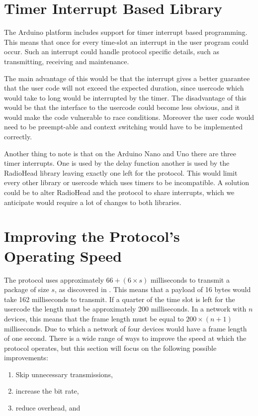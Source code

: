 \section{Timer Interrupt Based Library}
The Arduino platform includes support for timer interrupt based programming.
This means that once for every time-slot an interrupt in the user program could occur.
Such an interrupt could handle protocol specific details, such as transmitting, receiving and maintenance.

The main advantage of this would be that the interrupt gives a better guarantee that the user code will not exceed the expected duration, since usercode which would take to long would be interrupted by the timer.
The disadvantage of this would be that the interface to the usercode could become less obvious, and it would make the code vulnerable to race conditions.
Moreover the user code would need to be preempt-able and context switching would have to be implemented correctly.

Another thing to note is that on the Arduino Nano and Uno there are three timer interrupts.
One is used by the delay function another is used by the RadioHead library leaving exactly one left for the protocol.
This would limit every other library or usercode which uses timers to be incompatible.
A solution could be to alter RadioHead and the protocol to share interrupts, which we anticipate would require a lot of changes to both libraries.

\section{Improving the Protocol's Operating Speed}
The protocol uses approximately $66 + (6 \times s)$ milliseconds to transmit a package of size $s$, as discovered in  . 
This means that a payload of 16 bytes would take 162 milliseconds to transmit.
If a quarter of the time slot is left for the usercode the length must be approximately 200 milliseconds.
In a network with $n$ devices, this means that the frame length must be equal to $200 \times (n + 1)$ milliseconds.
Due to which a network of four devices would have a frame length of one second.
There is a wide range of ways to improve the speed at which the protocol operates, but this section will focus on the following possible improvements:
\begin{enumerate}[label=\itshape \alph*\upshape)]
    \item Skip unnecessary transmissions,
    \item increase the bit rate, 
    \item reduce overhead, and
\end{enumerate} 

